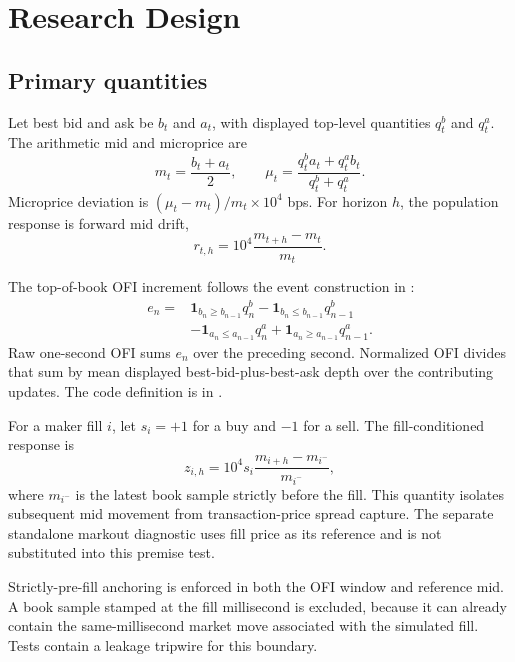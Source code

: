 \section{Research Design}

\subsection{Primary quantities}

Let best bid and ask be $b_t$ and $a_t$, with displayed top-level quantities
$q^b_t$ and $q^a_t$. The arithmetic mid and microprice are
\begin{equation}
  m_t=\frac{b_t+a_t}{2}, \qquad
  \mu_t=\frac{q^b_ta_t+q^a_tb_t}{q^b_t+q^a_t}.
\end{equation}
Microprice deviation is $(\mu_t-m_t)/m_t\times10^4$ bps. For horizon $h$,
the population response is forward mid drift,
\begin{equation}
  r_{t,h}=10^4\frac{m_{t+h}-m_t}{m_t}.
\end{equation}

The top-of-book OFI increment follows the event construction in
\citet{cont2014}:
\begin{align}
 e_n={}&\mathbf{1}_{b_n\ge b_{n-1}}q^b_n
       -\mathbf{1}_{b_n\le b_{n-1}}q^b_{n-1} \\
     &-\mathbf{1}_{a_n\le a_{n-1}}q^a_n
       +\mathbf{1}_{a_n\ge a_{n-1}}q^a_{n-1}.
\end{align}
Raw one-second OFI sums $e_n$ over the preceding second. Normalized OFI divides
that sum by mean displayed best-bid-plus-best-ask depth over the contributing
updates. The code definition is in .

For a maker fill $i$, let $s_i=+1$ for a buy and $-1$ for a sell. The
fill-conditioned response is
\begin{equation}
  z_{i,h}=10^4s_i\frac{m_{i+h}-m_{i^-}}{m_{i^-}},
\end{equation}
where $m_{i^-}$ is the latest book sample strictly before the fill. This
quantity isolates subsequent mid movement from transaction-price spread
capture. The separate standalone markout diagnostic uses fill price as its
reference and is not substituted into this premise test.

Strictly-pre-fill anchoring is enforced in both the OFI window and reference
mid. A book sample stamped at the fill millisecond is excluded, because it can
already contain the same-millisecond market move associated with the simulated
fill. Tests contain a leakage tripwire for this boundary.

